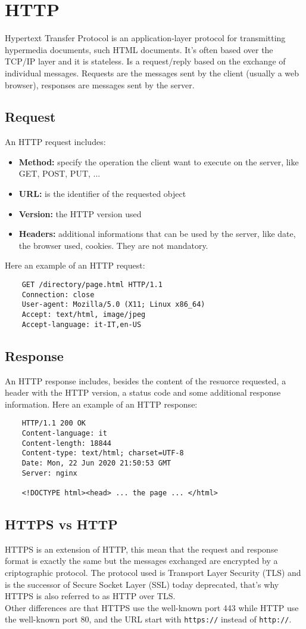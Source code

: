 \section{HTTP}
Hypertext Transfer Protocol is an application-layer protocol for transmitting hypermedia documents, such HTML documents. It's often based over the TCP/IP layer and it is stateless. Is a request/reply based on the exchange of individual messages. Requests are the messages sent by the client (usually a web browser), responses are messages sent by the server.
\subsection{Request}
An HTTP request includes:
\begin{itemize}
    \item{\textbf{Method:} specify the operation the client want to execute on the server, like GET, POST, PUT, ...}
    \item{\textbf{URL:} is the identifier of the requested object}
    \item{\textbf{Version:} the HTTP version used}
    \item{\textbf{Headers:} additional informations that can be used by the server, like date, the browser used, cookies. They are not mandatory.}
\end{itemize}
Here an example of an HTTP request:
\begin{lstlisting}
    GET /directory/page.html HTTP/1.1
    Connection: close
    User-agent: Mozilla/5.0 (X11; Linux x86_64)
    Accept: text/html, image/jpeg
    Accept-language: it-IT,en-US
\end{lstlisting}

\subsection{Response}
An HTTP response includes, besides the content of the resuorce requested, a header with the HTTP version, a status code and some additional response information.
Here an example of an HTTP response:
\begin{lstlisting}
    HTTP/1.1 200 OK
    Content-language: it
    Content-length: 18844
    Content-type: text/html; charset=UTF-8
    Date: Mon, 22 Jun 2020 21:50:53 GMT
    Server: nginx

    <!DOCTYPE html><head> ... the page ... </html>
\end{lstlisting}
\subsection{HTTPS vs HTTP}
HTTPS is an extension of HTTP, this mean that the request and response format is exactly the same but the messages exchanged are encrypted by a criptographic protocol. The protocol used is Transport Layer Security (TLS) and is the successor of Secure Socket Layer (SSL) today deprecated, that's why HTTPS is also referred to as HTTP over TLS.\\
Other differences are that HTTPS use the well-known port 443 while HTTP use the well-known port 80, and the URL start with \texttt{https://} instead of \texttt{http://}.

